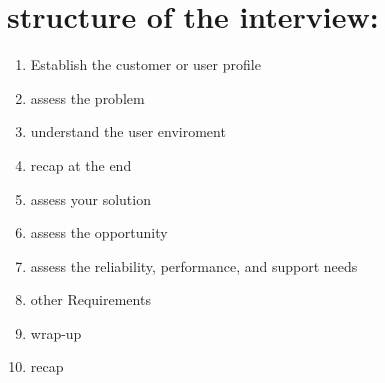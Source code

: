 \documentclass[letterpaper]{article}
\begin{document}
\section{structure of the interview:}
\begin{enumerate}
 \item Establish the customer or user profile
 \item assess the problem
 \item understand the user enviroment
 \item recap at the end
 \item assess your solution
 \item assess the opportunity
 \item assess the reliability, performance, and support needs
 \item other Requirements
 \item wrap-up
 \item recap
\end{enumerate}
\end{document}
